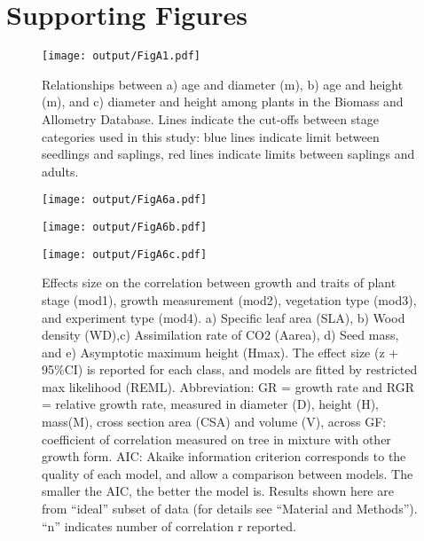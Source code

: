 \documentclass[10pt,twoside]{article}\usepackage[]{graphicx}\usepackage[]{color}
\date{}
\begin{document}
\maketitle

\tableofcontents

\renewcommand{\thefigure}{S\arabic{figure}}
\renewcommand{\thetable}{S\arabic{table}}

\section{Supporting Figures}\label{app:supp_info_figures}

\begin{figure}[h!]
\centering
\texttt{[image: output/FigA1.pdf]}
\caption{Relationships between a) age and diameter (m), b) age and height (m), and c) diameter and height among plants in the Biomass and Allometry Database. Lines indicate the cut-offs between stage categories used in this study: blue lines indicate limit between seedlings and saplings, red lines indicate limits between saplings and adults.}
\label{fig:figA1}
\end{figure}

\begin{figure}[h!]
\centering
\texttt{[image: output/FigA6a.pdf]}
\end{figure}

\begin{figure}[h!]
\centering
\texttt{[image: output/FigA6b.pdf]}
\end{figure}

\begin{figure}[h!]
\centering
\texttt{[image: output/FigA6c.pdf]}
\caption{Effects size on the correlation between growth and traits of plant stage (mod1), growth measurement (mod2), vegetation type (mod3), and experiment type (mod4). a) Specific leaf area (SLA), b) Wood density (WD),c) Assimilation rate of CO2 (Aarea), d) Seed mass, and e) Asymptotic maximum height (Hmax). The effect size (z + 95\%CI) is reported for each class, and models are fitted by restricted max likelihood (REML). Abbreviation: GR = growth rate and RGR = relative growth rate, measured in diameter (D), height (H), mass(M), cross section area (CSA) and volume (V), across GF: coefficient of correlation measured on tree in mixture with other growth form. AIC: Akaike information criterion corresponds to the quality of each model, and allow a comparison between models. The smaller the AIC, the better the model is. Results shown here are from ``ideal'' subset of data (for details see ``Material and Methods''). ``n'' indicates number of correlation r reported.}
\label{fig:figA6}
\end{figure}
\end{document}
